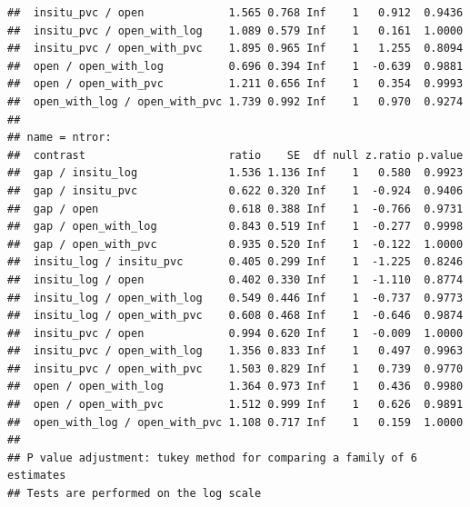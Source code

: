 \documentclass[
]{article}
\begin{document}
\begin{verbatim}
##  insitu_pvc / open             1.565 0.768 Inf    1   0.912  0.9436
##  insitu_pvc / open_with_log    1.089 0.579 Inf    1   0.161  1.0000
##  insitu_pvc / open_with_pvc    1.895 0.965 Inf    1   1.255  0.8094
##  open / open_with_log          0.696 0.394 Inf    1  -0.639  0.9881
##  open / open_with_pvc          1.211 0.656 Inf    1   0.354  0.9993
##  open_with_log / open_with_pvc 1.739 0.992 Inf    1   0.970  0.9274
## 
## name = ntror:
##  contrast                      ratio    SE  df null z.ratio p.value
##  gap / insitu_log              1.536 1.136 Inf    1   0.580  0.9923
##  gap / insitu_pvc              0.622 0.320 Inf    1  -0.924  0.9406
##  gap / open                    0.618 0.388 Inf    1  -0.766  0.9731
##  gap / open_with_log           0.843 0.519 Inf    1  -0.277  0.9998
##  gap / open_with_pvc           0.935 0.520 Inf    1  -0.122  1.0000
##  insitu_log / insitu_pvc       0.405 0.299 Inf    1  -1.225  0.8246
##  insitu_log / open             0.402 0.330 Inf    1  -1.110  0.8774
##  insitu_log / open_with_log    0.549 0.446 Inf    1  -0.737  0.9773
##  insitu_log / open_with_pvc    0.608 0.468 Inf    1  -0.646  0.9874
##  insitu_pvc / open             0.994 0.620 Inf    1  -0.009  1.0000
##  insitu_pvc / open_with_log    1.356 0.833 Inf    1   0.497  0.9963
##  insitu_pvc / open_with_pvc    1.503 0.829 Inf    1   0.739  0.9770
##  open / open_with_log          1.364 0.973 Inf    1   0.436  0.9980
##  open / open_with_pvc          1.512 0.999 Inf    1   0.626  0.9891
##  open_with_log / open_with_pvc 1.108 0.717 Inf    1   0.159  1.0000
## 
## P value adjustment: tukey method for comparing a family of 6 estimates 
## Tests are performed on the log scale
\end{verbatim}
\end{document}
